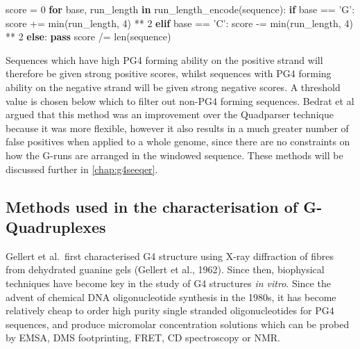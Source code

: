 \documentclass[12pt,a4paper,]{report}
\newenvironment{Shaded}{}{}
\newcommand{\BuiltInTok}[1]{#1}
\newcommand{\ControlFlowTok}[1]{\textcolor[rgb]{0.00,0.44,0.13}{\textbf{#1}}}
\newcommand{\DecValTok}[1]{\textcolor[rgb]{0.25,0.63,0.44}{#1}}
\newcommand{\KeywordTok}[1]{\textcolor[rgb]{0.00,0.44,0.13}{\textbf{#1}}}
\newcommand{\NormalTok}[1]{#1}
\newcommand{\OperatorTok}[1]{\textcolor[rgb]{0.40,0.40,0.40}{#1}}
\newcommand{\StringTok}[1]{\textcolor[rgb]{0.25,0.44,0.63}{#1}}
\begin{document}
\begin{Shaded}
\begin{Highlighting}[]
\NormalTok{score }\OperatorTok{=} \DecValTok{0}
\ControlFlowTok{for}\NormalTok{ base, run_length }\KeywordTok{in}\NormalTok{ run_length_encode(sequence):}
    \ControlFlowTok{if}\NormalTok{ base }\OperatorTok{==} \StringTok{'G'}\NormalTok{:}
\NormalTok{        score }\OperatorTok{+=} \BuiltInTok{min}\NormalTok{(run_length, }\DecValTok{4}\NormalTok{) }\OperatorTok{**} \DecValTok{2}
    \ControlFlowTok{elif}\NormalTok{ base }\OperatorTok{==} \StringTok{'C'}\NormalTok{:}
\NormalTok{        score }\OperatorTok{-=} \BuiltInTok{min}\NormalTok{(run_length, }\DecValTok{4}\NormalTok{) }\OperatorTok{**} \DecValTok{2}
    \ControlFlowTok{else}\NormalTok{:}
        \ControlFlowTok{pass}
\NormalTok{score }\OperatorTok{/=} \BuiltInTok{len}\NormalTok{(sequence)}
\end{Highlighting}
\end{Shaded}

Sequences which have high PG4 forming ability on the positive strand
will therefore be given strong positive scores, whilst sequences with
PG4 forming ability on the negative strand will be given strong negative
scores. A threshold value is chosen below which to filter out non-PG4
forming sequences. Bedrat et al argued that this method was an
improvement over the Quadparser technique because it was more flexible,
however it also results in a much greater number of false positives when
applied to a whole genome, since there are no constraints on how the
G-runs are arranged in the windowed sequence. These methods will be
discussed further in \autoref{chap:g4seeqer}.

\newpage

\hypertarget{methods-used-in-the-characterisation-of-g-quadruplexes}{%
\subsection{Methods used in the characterisation of
G-Quadruplexes}\label{methods-used-in-the-characterisation-of-g-quadruplexes}}

\label{ssec:biophys_char_g4s}

Gellert et al.~first characterised G4 structure using X-ray diffraction
of fibres from dehydrated guanine gels (Gellert et al., 1962). Since
then, biophysical techniques have become key in the study of G4
structures \emph{in vitro}. Since the advent of chemical DNA
oligonucleotide synthesis in the 1980s, it has become relatively cheap
to order high purity single stranded oligonucleotides for PG4 sequences,
and produce micromolar concentration solutions which can be probed by
EMSA, DMS footprinting, FRET, CD spectroscopy or NMR.
\end{document}
